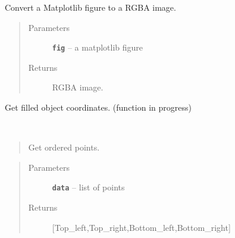 \documentclass[letterpaper,10pt,english]{sphinxmanual}
\begin{document}

\begin{fulllineitems}
\label{RRtoolbox.lib:RRtoolbox.lib.image.fig2bgra}
Convert a Matplotlib figure to a RGBA image.
\begin{quote}\begin{description}
\item[{Parameters}] \leavevmode
\textbf{\texttt{fig}} -- a matplotlib figure

\item[{Returns}] \leavevmode
RGBA image.

\end{description}\end{quote}

\end{fulllineitems}


\begin{fulllineitems}
\label{RRtoolbox.lib:RRtoolbox.lib.image.getcoors}
\end{fulllineitems}


\begin{fulllineitems}
\label{RRtoolbox.lib:RRtoolbox.lib.image.getgeometrycoors}
Get filled object coordinates. (function in progress)

\end{fulllineitems}


\begin{fulllineitems}
\label{RRtoolbox.lib:RRtoolbox.lib.image.getrectcoors}~\begin{quote}

Get ordered points.
\end{quote}
\begin{quote}\begin{description}
\item[{Parameters}] \leavevmode
\textbf{\texttt{data}} -- list of points

\item[{Returns}] \leavevmode
{[}Top\_left,Top\_right,Bottom\_left,Bottom\_right{]}

\end{description}\end{quote}

\end{fulllineitems}
\end{document}
